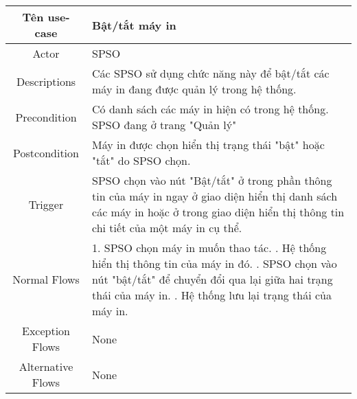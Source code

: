 \begin{xltabular}{\textwidth}{|c|X|}
    \hline
    \textbf{Tên use-case} & \textbf{Bật/tắt máy in} \\
    \hline
    Actor & SPSO \\
    \hline
    Descriptions & Các SPSO sử dụng chức năng này để bật/tắt các máy in đang được quản lý trong hệ thống. \\
    \hline 
    Precondition &Có danh sách các máy in hiện có trong hệ thống. 
    \newline
    SPSO đang ở trang "Quản lý"
    \\
    
    \hline
    Postcondition &Máy in được chọn hiển thị trạng thái "bật" hoặc "tắt" do SPSO chọn.\\
    \hline
    Trigger &SPSO chọn vào nút "Bật/tắt" ở trong phần thông tin của máy in ngay ở giao diện hiển thị danh sách các máy in hoặc ở trong giao diện hiển thị thông tin chi tiết của một máy in cụ thể.\\
    \hline
    Normal Flows & 
    1. SPSO chọn máy in muốn thao tác.
    . Hệ thống hiển thị thông tin của máy in đó.
    . SPSO chọn vào nút "bật/tắt" để chuyển đổi qua lại giữa hai trạng thái của máy in.
    . Hệ thống lưu lại trạng thái của máy in.
    \\
    \hline
    Exception Flows & None
    \\
    \hline
    Alternative Flows & None
    \\
    \hline
\end{xltabular}


